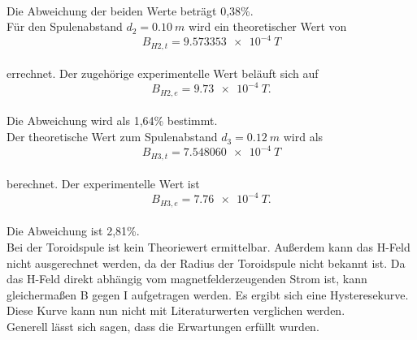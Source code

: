\\Die Abweichung der beiden Werte beträgt 0,38\%.
\\Für den Spulenabstand $d_{2}=\SI{0.10}{m}$ wird ein theoretischer Wert von
\begin{equation*}
  B_{H2, t} = \SI{9.573353e-4}{T}
\end{equation*}
\\errechnet. Der zugehörige experimentelle Wert beläuft sich auf
\begin{equation*}
  B_{H2, e} = \SI{9.73e-4}{T}.
\end{equation*}
\\Die Abweichung wird als 1,64\% bestimmt.
\\Der theoretische Wert zum Spulenabstand $d_{3}=\SI{0.12}{m}$ wird als
\begin{equation*}
  B_{H3, t} = \SI{7.548060e-4}{T}
\end{equation*}
\\berechnet. Der experimentelle Wert ist
\begin{equation*}
  B_{H3, e} = \SI{7.76e-4}{T}.
\end{equation*}
\\Die Abweichung ist 2,81\%.
\\Bei der Toroidspule ist kein Theoriewert ermittelbar.
Außerdem kann das H-Feld nicht ausgerechnet werden, da der Radius der Toroidspule nicht bekannt ist.
Da das H-Feld direkt abhängig vom magnetfelderzeugenden Strom ist, kann gleichermaßen B gegen I aufgetragen werden.
Es ergibt sich eine Hysteresekurve.
Diese Kurve kann nun nicht mit Literaturwerten verglichen werden.
\\Generell lässt sich sagen, dass die Erwartungen erfüllt wurden.
